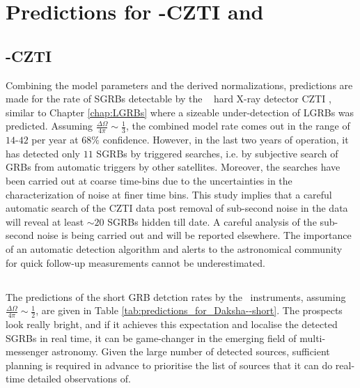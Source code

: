 \section{Predictions for \AS-CZTI and \D}
\label{sec:predictions--short}

\subsection{\AS -CZTI}
\label{subsec:predictions_for_CZTI--short}
Combining the model parameters and the derived normalizations, predictions are made for the rate of SGRBs detectable by the \AS\ \citep{Rao_et_al.-2016-arXiv-Astrosat} hard X-ray detector CZTI \citep{Rao_et_al.-2016-ApJ, Bhalerao_et_al.-2017-JApA}, similar to Chapter \ref{chap:LGRBs} where a sizeable under-detection of LGRBs was predicted. Assuming $\frac{\Delta\Omega}{4\pi} \sim \frac{1}{3}$, the combined model rate comes out in the range of $14$-$42$ per year at $68 \%$ confidence. However, in the last two years of operation, it has detected only $11$ SGRBs by triggered searches, i.e. by subjective search of GRBs from automatic triggers by other satellites. Moreover, the searches have been carried out at coarse time-bins due to the uncertainties in the characterization of noise at finer time bins. This study implies that a careful automatic search of the CZTI data post removal of sub-second noise in the data will reveal at least $\sim 20$ SGRBs hidden till date. A careful analysis of the sub-second noise is being carried out and will be reported elsewhere. The importance of an automatic detection algorithm and alerts to the astronomical community for quick follow-up measurements cannot be underestimated.

\subsection{\D}
\label{subsec:predictions_for_Daksha--short}
The predictions of the short GRB detction rates by the \D\ instruments, assuming $\frac{\Delta \Omega}{4\pi} \sim \frac{1}{2}$, are given in Table \ref{tab:predictions_for_Daksha--short}. The prospects look really bright, and if it achieves this expectation and localise the detected SGRBs in real time, it can be game-changer in the emerging field of multi-messenger astronomy. Given the large number of detected sources, sufficient planning is required in advance to prioritise the list of sources that it can do real-time detailed observations of.

